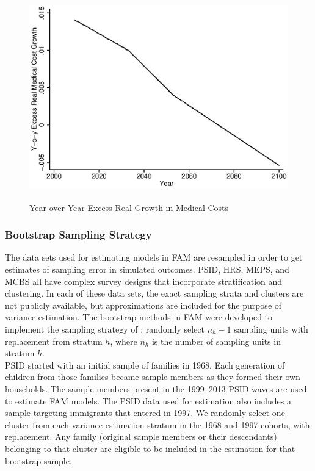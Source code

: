 \begin{figure}
\caption{Year-over-Year Excess Real Growth in Medical Costs} \label{figure:medgrowth_yearly}
 \centering
	 \includegraphics[height=3.5in]{AppOutput/Health/medgrowth_yearly}
\end{figure}

\subsubsection{Bootstrap Sampling Strategy}

\noindent The data sets used for estimating models in FAM are resampled in order to get estimates of sampling error in simulated outcomes.  PSID, HRS, MEPS, and MCBS all have complex survey designs that incorporate stratification and clustering.  In each of these data sets, the exact sampling strata and clusters are not publicly available, but approximations are included for the purpose of variance estimation.  The bootstrap methods in FAM were developed to implement the sampling strategy of \citet{McCarthy-Snowden_1985_Bootstrap}: randomly select $n_h-1$ sampling units with replacement from stratum $h$, where $n_h$ is the number of sampling units in stratum $h$. \\

\noindent PSID started with an initial sample of families in 1968.  Each generation of children from those families became sample members as they formed their own households.  The sample members present in the 1999--2013 PSID waves are used to estimate FAM models.   The PSID data used for estimation also includes a sample targeting immigrants that entered in 1997.  We randomly select one cluster from each variance estimation stratum in the 1968 and 1997 cohorts, with replacement.  Any family (original sample members or their descendants) belonging to that cluster are eligible to be included in the estimation for that bootstrap sample. \\


